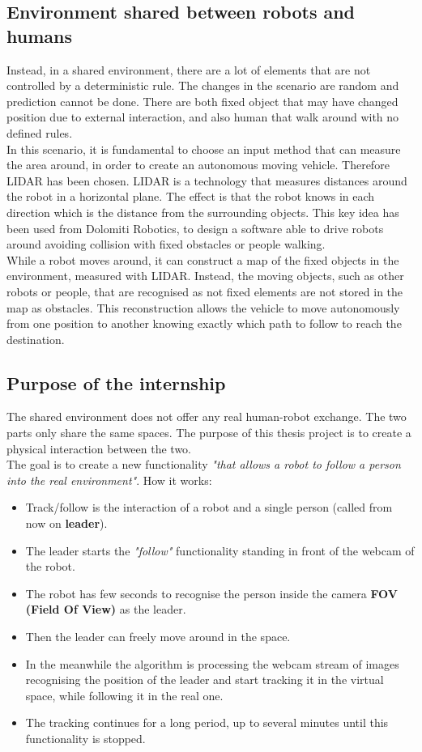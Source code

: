 \subsection{Environment shared between robots and humans}
Instead, in a shared environment, there are a lot of elements that are not controlled by a deterministic rule. The changes in the scenario are random and prediction cannot be done. There are both fixed object that may have changed position due to external interaction, and also human that walk around with no defined rules.\\
In this scenario, it is fundamental to choose an input method that can measure the area around, in order to create an autonomous moving vehicle. Therefore LIDAR has been chosen. LIDAR is a technology that measures distances around the robot in a horizontal plane. The effect is that the robot knows in each direction which is the distance from the surrounding objects. This key idea has been used from Dolomiti Robotics, to design a software able to drive robots around avoiding collision with fixed obstacles or people walking.\\
While a robot moves around, it can construct a map of the fixed objects in the environment, measured with LIDAR. Instead, the moving objects, such as other robots or people, that are recognised as not fixed elements are not stored in the map as obstacles. This reconstruction allows the vehicle to move autonomously from one position to another knowing exactly which path to follow to reach the destination.

\subsection{Purpose of the internship}
The shared environment does not offer any real human-robot exchange. The two parts only share the same spaces. The purpose of this thesis project is to create a physical interaction between the two.\\
The goal is to create a new functionality \textit{"that allows a robot to follow a person into the real environment"}. How it works:
\begin{itemize}
	\item Track/follow is the interaction of a robot and a single person (called from now on \textbf{leader}).
	\item The leader starts the \textit{"follow"} functionality standing in front of the webcam of the robot.
	\item The robot has few seconds to recognise the person inside the camera \textbf{FOV (Field Of View)} as the leader.
	\item Then the leader can freely move around in the space. 
	\item In the meanwhile the algorithm is processing the webcam stream of images recognising the position of the leader and start tracking it in the virtual space, while following it in the real one.
	\item The tracking continues for a long period, up to several minutes until this functionality is stopped.
\end{itemize}


